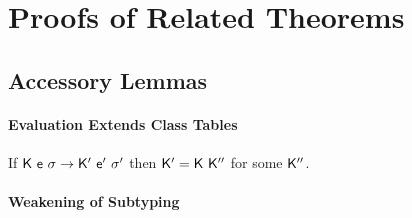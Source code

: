\documentclass[a4paper,USenglish]{tex/lipics-v2016}
\begin{document}









\section{Proofs of Related Theorems}
\subsection{Accessory Lemmas}

\paragraph{Evaluation Extends Class Tables}

If ${{\sf{K}}}~{{\sf{e}}}~{\sigma} \rightarrow {{\ensuremath{{\sf{K'}}}}}~{{{{\sf{e'}}}}}~{{{\sigma'}}}$ then ${{\sf{K'}}} = {\sf{K}}~{{\sf{K''}}}$ for some ${{\sf{K''}}}$.

\paragraph{Weakening of Subtyping}
\end{document}

